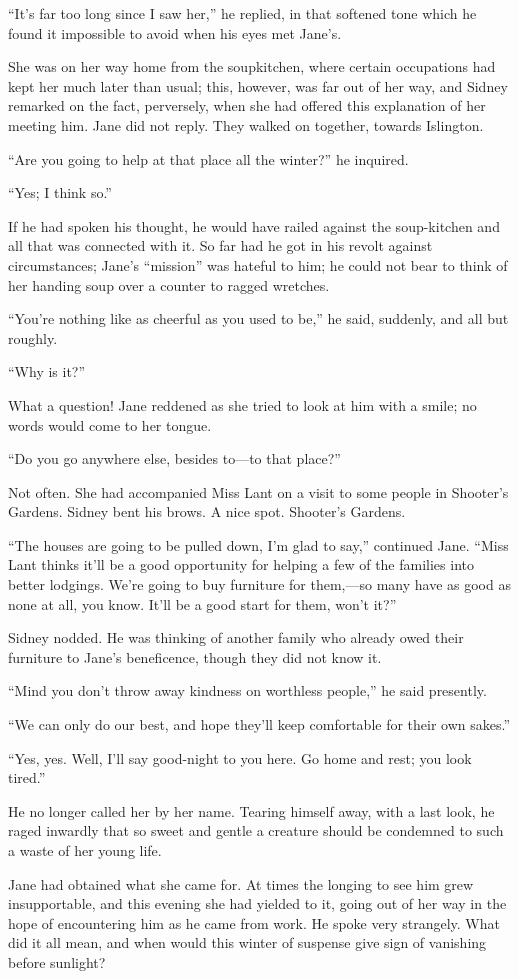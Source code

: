``It's far too long since I saw her,'' he replied, in that softened tone
which he found it impossible to avoid when his eyes met Jane's.

She was on her way home from the soupkitchen, where certain occupations
had kept her much later than usual; this, however, was far out of her
way, and Sidney remarked on the fact, perversely, when she had offered
this explanation of her meeting him. Jane did not reply. They walked on
together, towards Islington.

``Are you going to help at that place all the winter?'' he inquired.

{\protect\hypertarget{22}{}{}}``Yes; I think so.''

If he had spoken his thought, he would have railed against the
soup-kitchen and all that was connected with it. So far had he got in
his revolt against circumstances; Jane's ``mission'' was hateful to him;
he could not bear to think of her handing soup over a counter to ragged
wretches.

``You're nothing like as cheerful as you used to be,'' he said,
suddenly, and all but roughly.

``Why is it?''

What a question! Jane reddened as she tried to look at him with a smile;
no words would come to her tongue.

``Do you go anywhere else, besides to---to that place?''

Not often. She had accompanied Miss Lant on a visit to some people in
Shooter's Gardens. Sidney bent his brows. A nice spot. Shooter's
Gardens.

``The houses are going to be pulled down, I'm glad to say,'' continued
Jane. ``Miss Lant thinks it'll be a good opportunity for helping a few
of the families into better lodgings. We're going to buy furniture for
them,---so many have as good as none at all, you
{\protect\hypertarget{23}{}{}}know. It'll be a good start for them,
won't it?''

Sidney nodded. He was thinking of another family who already owed their
furniture to Jane's beneficence, though they did not know it.

``Mind you don't throw away kindness on worthless people,'' he said
presently.

``We can only do our best, and hope they'll keep comfortable for their
own sakes.''

``Yes, yes. Well, I'll say good-night to you here. Go home and rest; you
look tired.''

He no longer called her by her name. Tearing himself away, with a last
look, he raged inwardly that so sweet and gentle a creature should be
condemned to such a waste of her young life.

Jane had obtained what she came for. At times the longing to see him
grew insupportable, and this evening she had yielded to it, going out of
her way in the hope of encountering him as he came from work. He spoke
very strangely. What did it all mean, and when would this winter of
suspense give sign of vanishing before sunlight?
